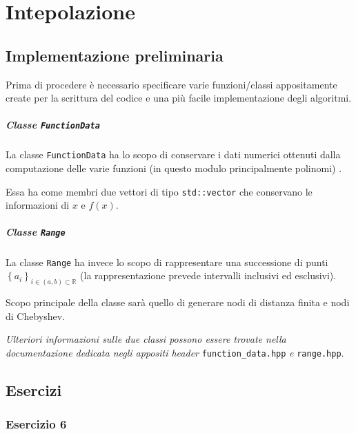 \setchapterpreamble[u]{\margintoc}
\chapter{Intepolazione}


\section{Implementazione preliminaria}

Prima di procedere è necessario specificare varie funzioni/classi appositamente create
per la scrittura del codice e una più facile implementazione degli algoritmi.

\paragraph{Classe \texttt{FunctionData}}

La classe \texttt{FunctionData} ha lo scopo di conservare i dati numerici ottenuti
dalla computazione delle varie funzioni (in questo modulo principalmente polinomi) .

Essa ha come membri due vettori di tipo \texttt{std::vector} che conservano le
informazioni di $x$ e $f(x)$.

\paragraph{Classe \texttt{Range}}

La classe \texttt{Range} ha invece lo scopo di rappresentare una successione di
punti $\left\{a_i\right\}_{i \in (a, b) \subset \mathbb{R}}$ (la rappresentazione
prevede intervalli inclusivi ed esclusivi).

Scopo principale della classe sarà quello di generare nodi di distanza finita e
nodi di Chebyshev.

\textit{Ulteriori informazioni sulle due classi possono essere trovate nella
	documentazione dedicata negli appositi header} \texttt{function\_data.hpp} \textit{e}
\texttt{range.hpp}.

\section{Esercizi}

\subsection{Esercizio 6}

